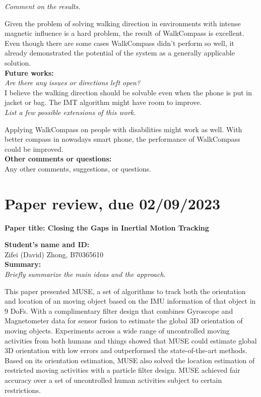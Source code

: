 \documentclass[11pt, oneside]{article}   	%
\begin{document}
\noindent \emph{Comment on the results.}

Given the problem of solving walking direction in environments with intense magnetic influence is a hard problem, the result of WalkCompass is excellent. Even though there are some cases WalkCompass didn't perform so well, it already demonstrated the potential of the system as a generally applicable solution. \\

\noindent \textbf{Future works:}\\
\emph{Are there any issues or directions left open?}\\
I believe the walking direction should be solvable even when the phone is put in jacket or bag. The IMT algorithm might have room to improve.\\

\noindent \emph{List a few possible extensions of this work.}

 Applying WalkCompass on people with disabilities might work as well. With better compass in nowadays smart phone, the performance of WalkCompass could be improved.\\


\noindent \textbf{Other comments or questions:}\\
Any other comments, suggestions, or questions.\\

\newpage
\section{Paper review, due 02/09/2023}
\begin{center}
\noindent
\textbf{\Large Paper title: Closing the Gaps in Inertial Motion Tracking}
\end{center}


\noindent \textbf{Student's name and ID: }\\
Zifei (David) Zhong, B70365610\\

\noindent \textbf{Summary:}\\
\emph{Briefly summarize the main ideas and the approach}.

This paper presented MUSE, a set of algorithms to track both the orientation and location of an moving object based on the IMU information of that object in 9 DoFs. With a complimentary filter design that combines Gyroscope and Magnetometer data for sensor fusion to estimate the global 3D orientation of moving objects. Experiments across a wide range of uncontrolled moving activities from both humans and things showed that MUSE could estimate global 3D orientation with low errors and outperformed the state-of-the-art methods. Based on its orientation estimation, MUSE also solved the location estimation of restricted moving activities with a particle filter design. MUSE achieved fair accuracy over a set of uncontrolled human activities subject to certain restrictions. \\
\end{document}
